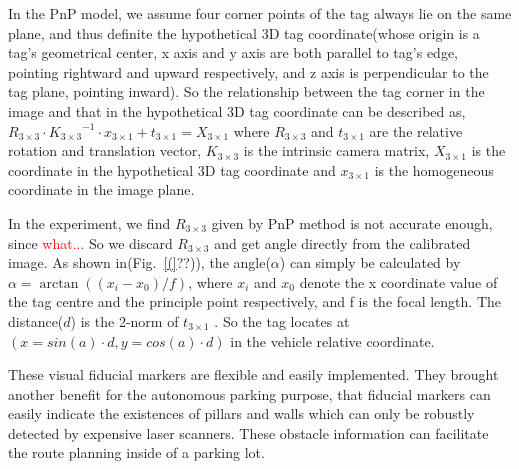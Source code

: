 \documentclass[journal]{IEEEtran}
\newcommand{\Reffig}[1]{Fig.~\ref{#1}}
\newcommand{\COMMENT}[1]{\textcolor{red}{#1}}
\begin{document}
In the PnP model, we assume four corner points of the tag always lie on the same plane, and thus definite the hypothetical 3D tag coordinate(whose origin is a tag’s geometrical center, x axis and y axis are both parallel to tag’s edge, pointing rightward and upward respectively, and z axis is perpendicular to the tag plane, pointing inward). 
So the relationship between the tag corner in the image and that in the hypothetical 3D tag coordinate can be described as,
${R}_{3 \times 3} \cdot {{K}_{3 \times 3}}^{-1} \cdot {x}_{3 \times 1}+{t}_{3 \times 1}={X}_{3 \times 1}$
where ${R}_{3 \times 3}$ and ${t}_{3 \times 1}$ are the relative rotation and translation vector, 
${K}_{3 \times 3}$ is the intrinsic camera matrix, 
${X}_{3 \times 1}$ is the coordinate in the hypothetical 3D tag coordinate and ${x}_{3 \times 1}$ is the homogeneous coordinate in the image plane. 

In the experiment, we find ${R}_{3 \times 3}$ given by PnP method is not accurate enough, since \COMMENT{what...}
So we discard ${R}_{3 \times 3}$ and get angle directly from the calibrated image.
As shown in(\Reffig(??)), the angle($\alpha$) can simply be calculated by $\alpha = \arctan((x_i - x_0) / f)$, where $x_i$ and $x_0$ denote the x coordinate value of the tag centre and the principle point respectively, and f is the focal length.
The distance($d$) is the 2-norm of ${t}_{3 \times 1}$ . 
So the tag locates at $( x=sin(a) \cdot d, y=cos(a) \cdot d)$ in the vehicle relative coordinate.

%

These visual fiducial markers are flexible and easily implemented.
They brought another benefit for the autonomous parking purpose, that fiducial markers can easily indicate the existences of pillars and walls which can only be robustly detected by expensive laser scanners.
These obstacle information can facilitate the route planning inside of a parking lot. 
\end{document}
